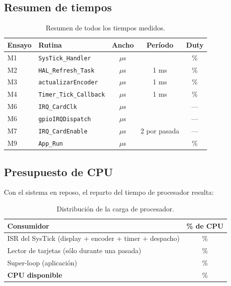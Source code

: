 \documentclass[11pt,a4paper]{article}
\newcommand{\dato}[1][2cm]{\underline{\hspace{#1}}}
\newcommand{\us}{\ensuremath{\mu}s}
\begin{document}
\subsection{Resumen de tiempos}

\begin{table}[H]
\centering
\begin{tabular}{@{}llccc@{}}
\toprule
\textbf{Ensayo} & \textbf{Rutina} & \textbf{Ancho} & \textbf{Período} & \textbf{Duty} \\
\midrule
M1 & \texttt{SysTick\_Handler}   & \dato[1.3cm] \us & \dato[1.3cm] & \dato[1cm] \% \\
M2 & \texttt{HAL\_Refresh\_Task} & \dato[1.3cm] \us & 1 ms         & \dato[1cm] \% \\
M3 & \texttt{actualizarEncoder}  & \dato[1.3cm] \us & 1 ms         & \dato[1cm] \% \\
M4 & \texttt{Timer\_Tick\_Callback} & \dato[1.3cm] \us & 1 ms      & \dato[1cm] \% \\
M6 & \texttt{IRQ\_CardClk}       & \dato[1.3cm] \us & \dato[1.3cm] & --- \\
M6 & \texttt{gpioIRQDispatch}    & \dato[1.3cm] \us & \dato[1.3cm] & --- \\
M7 & \texttt{IRQ\_CardEnable}    & \dato[1.3cm] \us & 2 por pasada & --- \\
M9 & \texttt{App\_Run}           & \dato[1.3cm] \us & \dato[1.3cm] & \dato[1cm] \% \\
\bottomrule
\end{tabular}
\caption{Resumen de todos los tiempos medidos.}
\end{table}

\subsection{Presupuesto de CPU}

Con el sistema en reposo, el reparto del tiempo de procesador resulta:

\begin{table}[H]
\centering
\begin{tabular}{@{}lc@{}}
\toprule
\textbf{Consumidor} & \textbf{\% de CPU} \\
\midrule
ISR del SysTick (display + encoder + timer + despacho) & \dato[1.5cm] \% \\
Lector de tarjetas (sólo durante una pasada)           & \dato[1.5cm] \% \\
Super-loop (aplicación)                                 & \dato[1.5cm] \% \\
\midrule
\textbf{CPU disponible}                                 & \dato[1.5cm] \% \\
\bottomrule
\end{tabular}
\caption{Distribución de la carga de procesador.}
\end{table}
\end{document}
